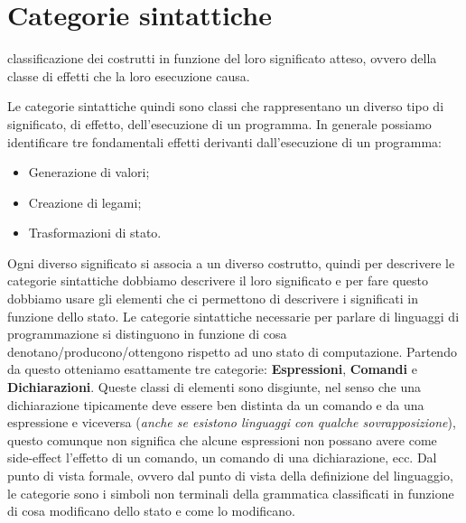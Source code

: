 \documentclass[oneside,a4paper,11pt]{book}
\theoremstyle{italicstyle}
\theoremstyle{normStyle}
\begin{document}
\section{Categorie sintattiche}
\begin{tcolorbox}[title={Categorie sintattiche}]
classificazione dei costrutti in funzione del loro significato atteso,
ovvero della classe di effetti che la loro esecuzione causa.
\end{tcolorbox}
Le categorie sintattiche quindi sono classi che rappresentano un diverso
tipo di significato, di effetto, dell’esecuzione di un programma.
In generale possiamo identificare tre fondamentali effetti derivanti
dall'esecuzione di un programma:
\begin{itemize}
  \item Generazione di valori;
  \item Creazione di legami;
  \item Trasformazioni di stato.
\end{itemize}
Ogni diverso significato si associa a un diverso costrutto,
quindi per descrivere le categorie sintattiche dobbiamo descrivere
il loro significato e per fare questo dobbiamo usare gli elementi che
ci permettono di descrivere i significati in funzione dello stato.
Le categorie sintattiche necessarie per parlare di linguaggi di
programmazione si distinguono in funzione di cosa denotano/producono/ottengono
rispetto ad uno stato di computazione. Partendo da questo otteniamo
esattamente tre categorie: \textbf{Espressioni}, \textbf{Comandi} e \textbf{Dichiarazioni}.
Queste classi di elementi sono disgiunte, nel senso che una
dichiarazione tipicamente deve essere ben distinta da un comando e
da una espressione e viceversa (\textit{anche se esistono linguaggi con qualche
sovrapposizione}), questo comunque non significa che alcune espressioni
non possano avere come side-effect l’effetto di un comando, un comando
di una dichiarazione, ecc. Dal punto di vista formale, ovvero dal punto
di vista della definizione del linguaggio, le categorie sono i simboli
non terminali della grammatica classificati in funzione di cosa modificano
dello stato e come lo modificano.
\end{document}
